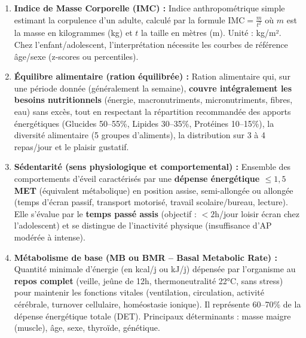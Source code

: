 \documentclass[11pt]{article}
\begin{document}
\begin{corrige}
\begin{enumerate}
\item \textbf{Indice de Masse Corporelle (IMC) :} Indice anthropométrique simple estimant la corpulence d'un adulte, calculé par la formule $\text{IMC} = \frac{m}{t^2}$ où $m$ est la masse en kilogrammes (kg) et $t$ la taille en mètres (m). Unité : kg/m². Chez l'enfant/adolescent, l'interprétation nécessite les courbes de référence âge/sexe (z-scores ou percentiles).
\item \textbf{Équilibre alimentaire (ration équilibrée) :} Ration alimentaire qui, sur une période donnée (généralement la semaine), \textbf{couvre intégralement les besoins nutritionnels} (énergie, macronutriments, micronutriments, fibres, eau) sans excès, tout en respectant la répartition recommandée des apports énergétiques (Glucides 50--55\%, Lipides 30--35\%, Protéines 10--15\%), la diversité alimentaire (5 groupes d'aliments), la distribution sur 3 à 4 repas/jour et le plaisir gustatif.
\item \textbf{Sédentarité (sens physiologique et comportemental) :} Ensemble des comportements d'éveil caractérisés par une \textbf{dépense énergétique $\le 1,5$ MET} (équivalent métabolique) en position assise, semi-allongée ou allongée (temps d'écran passif, transport motorisé, travail scolaire/bureau, lecture). Elle s'évalue par le \textbf{temps passé assis} (objectif : $< 2$h/jour loisir écran chez l'adolescent) et se distingue de l'inactivité physique (insuffisance d'AP modérée à intense).
\item \textbf{Métabolisme de base (MB ou BMR -- Basal Metabolic Rate) :} Quantité minimale d'énergie (en kcal/j ou kJ/j) dépensée par l'organisme au \textbf{repos complet} (veille, jeûne de 12h, thermoneutralité 22°C, sans stress) pour maintenir les fonctions vitales (ventilation, circulation, activité cérébrale, turnover cellulaire, homéostasie ionique). Il représente 60--70\% de la dépense énergétique totale (DET). Principaux déterminants : masse maigre (muscle), âge, sexe, thyroïde, génétique.
\end{enumerate}
\end{corrige}
\end{document}
